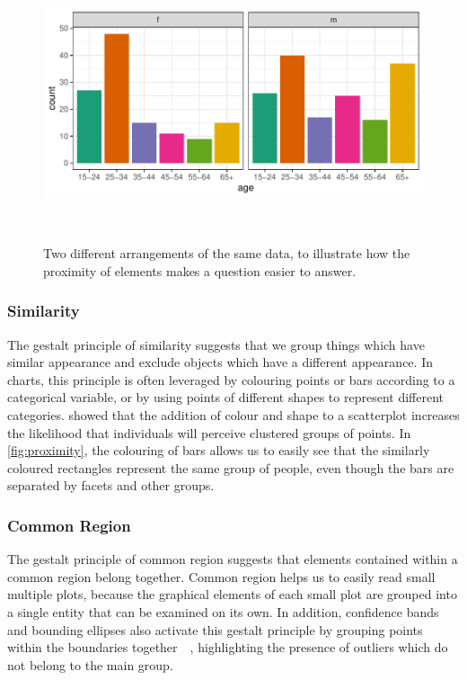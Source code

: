 \documentclass[letterpaper]{ar-1col}\usepackage[]{graphicx}\usepackage[]{color}
\begin{document}
\begin{figure}
\begin{minipage}{.60\textwidth}
\includegraphics[width=.99\textwidth]{figure/tb-setup-2}
\end{minipage}\\
\caption{Two different arrangements of the same data, to illustrate how the proximity of elements makes a question easier to answer. }\label{fig:proximity}
\end{figure}
\subsubsection{Similarity}
The gestalt principle of similarity suggests that we group things which have similar appearance and exclude objects which have a different appearance. In charts, this principle is often leveraged by colouring points or bars according to a categorical variable, or by using points of different shapes to represent different categories. \citet{vanderplasClustersBeatTrend2017} showed that the addition of colour and shape to a scatterplot increases the likelihood that individuals will perceive clustered groups of points. In \autoref{fig:proximity}, the colouring of bars allows us to easily see that the similarly coloured rectangles represent the same group of people, even though the bars are separated by facets and other groups. %

\subsubsection{Common Region}
The gestalt principle of common region suggests that elements contained within a common region belong together. Common region helps us to easily read small multiple plots, because the graphical elements of each small plot are grouped into a single entity that can be examined on its own. In addition, confidence bands and bounding ellipses also activate this gestalt principle by grouping points within the boundaries together~~\citep{vanderplasClustersBeatTrend2017}, highlighting the presence of outliers which do not belong to the main group.
\end{document}
